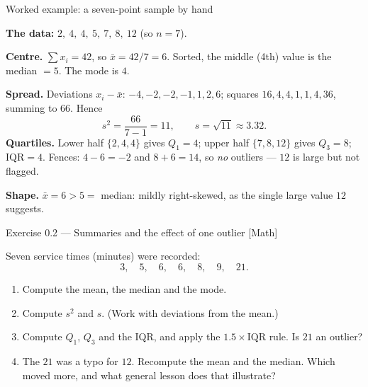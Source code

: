\documentclass[aspectratio=169,11pt]{beamer}
\begin{document}
\begin{frame}{Worked example: a seven-point sample by hand}
  \begin{numexample}
    \textbf{The data:} $2,\ 4,\ 4,\ 5,\ 7,\ 8,\ 12$ (so $n = 7$).

    \textbf{Centre.} $\sum x_i = 42$, so $\bar x = 42/7 = 6$. Sorted, the
    middle (4th) value is the median $=5$. The mode is $4$.

    \textbf{Spread.} Deviations $x_i - \bar x$: $-4,-2,-2,-1,1,2,6$; squares
    $16,4,4,1,1,4,36$, summing to $66$. Hence
    \[
      s^2 = \frac{66}{7-1} = 11, \qquad s = \sqrt{11} \approx 3.32 .
    \]
    \textbf{Quartiles.} Lower half $\{2,4,4\}$ gives $Q_1 = 4$; upper half
    $\{7,8,12\}$ gives $Q_3 = 8$; $\mathrm{IQR} = 4$. Fences:
    $4 - 6 = -2$ and $8 + 6 = 14$, so \emph{no} outliers --- $12$ is large but
    not flagged.

    \textbf{Shape.} $\bar x = 6 > 5 = $ median: mildly right-skewed, as the
    single large value $12$ suggests.
  \end{numexample}
\end{frame}

\begin{frame}{Exercise 0.2 --- Summaries and the effect of one outlier [Math]}
  \begin{exercise}
    Seven service times (minutes) were recorded:
    \[ 3,\quad 5,\quad 6,\quad 6,\quad 8,\quad 9,\quad 21 . \]
    \begin{enumerate}
      \item Compute the mean, the median and the mode.
      \item Compute $s^2$ and $s$. (Work with deviations from the mean.)
      \item Compute $Q_1$, $Q_3$ and the IQR, and apply the
            $1.5\times\mathrm{IQR}$ rule. Is $21$ an outlier?
      \item The $21$ was a typo for $12$. Recompute the mean and the median.
            Which moved more, and what general lesson does that illustrate?
    \end{enumerate}
  \end{exercise}
\end{frame}
\end{document}
